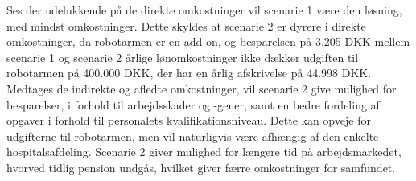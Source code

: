 Ses der udelukkende på de direkte omkostninger vil scenarie 1 være den løsning, med mindst
omkostninger. Dette skyldes at scenarie 2 er dyrere i direkte omkostninger, da robotarmen er en
add-on, og besparelsen på 3.205 DKK mellem scenarie 1 og scenarie 2 årlige lønomkostninger ikke dækker udgiften til robotarmen på 400.000 DKK, der har en årlig afskrivelse på 44.998 DKK. \\
Medtages de indirekte og afledte omkostninger, vil scenarie 2 give mulighed for besparelser, i forhold til arbejdsskader og -gener, samt en bedre fordeling af opgaver i forhold til personalets kvalifikationsniveau.  Dette kan opveje for udgifterne til robotarmen, men vil naturligvis være afhængig af den enkelte hospitalsafdeling. Scenarie 2 giver mulighed for længere tid på arbejdsmarkedet, hvorved tidlig pension undgås, hvilket giver færre omkostninger for samfundet.

